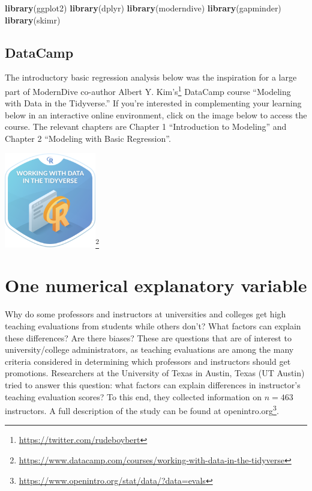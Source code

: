 \documentclass[12pt,]{krantz}
\makeatletter
\newenvironment{Shaded}{\begin{snugshade}}{\end{snugshade}}
\newcommand{\KeywordTok}[1]{\textcolor[rgb]{0.27,0.27,0.27}{\textbf{#1}}}
\newcommand{\NormalTok}[1]{#1}
\renewcommand{\href}[2]{#2\footnote{\url{#1}}}
\newenvironment{kframe}{%
\medskip{}
\setlength{\fboxsep}{.8em}
 \def\at@end@of@kframe{}%
 \ifinner\ifhmode%
  \def\at@end@of@kframe{\end{minipage}}%
  \begin{minipage}{\columnwidth}%
 \fi\fi%
 \def\FrameCommand##1{\hskip\@totalleftmargin \hskip-\fboxsep
 \colorbox{shadecolor}{##1}\hskip-\fboxsep
     \hskip-\linewidth \hskip-\@totalleftmargin \hskip\columnwidth}%
 \MakeFramed {\advance\hsize-\width
   \@totalleftmargin\z@ \linewidth\hsize
   \@setminipage}}%
 {\par\unskip\endMakeFramed%
 \at@end@of@kframe}
\renewenvironment{Shaded}{\begin{kframe}}{\end{kframe}}
\theoremstyle{definition}
\theoremstyle{definition}
\theoremstyle{definition}
\theoremstyle{remark}
\makeatother
\begin{document}
\begin{Shaded}
\begin{Highlighting}[]
\KeywordTok{library}\NormalTok{(ggplot2)}
\KeywordTok{library}\NormalTok{(dplyr)}
\KeywordTok{library}\NormalTok{(moderndive)}
\KeywordTok{library}\NormalTok{(gapminder)}
\KeywordTok{library}\NormalTok{(skimr)}
\end{Highlighting}
\end{Shaded}

\subsection*{DataCamp}\label{datacamp-3}


The introductory basic regression analysis below was the inspiration for
a large part of ModernDive co-author
\href{https://twitter.com/rudeboybert}{Albert Y. Kim's} DataCamp course
``Modeling with Data in the Tidyverse.'' If you're interested in
complementing your learning below in an interactive online environment,
click on the image below to access the course. The relevant chapters are
Chapter 1 ``Introduction to Modeling'' and Chapter 2 ``Modeling with
Basic Regression''.

\begin{center}
\href{https://www.datacamp.com/courses/working-with-data-in-the-tidyverse}{\includegraphics[width=0.3\textwidth]{images/datacamp_working_with_data.png}}
\end{center}

\section{One numerical explanatory variable}\label{model1}

Why do some professors and instructors at universities and colleges get
high teaching evaluations from students while others don't? What factors
can explain these differences? Are there biases? These are questions
that are of interest to university/college administrators, as teaching
evaluations are among the many criteria considered in determining which
professors and instructors should get promotions. Researchers at the
University of Texas in Austin, Texas (UT Austin) tried to answer this
question: what factors can explain differences in instructor's teaching
evaluation scores? To this end, they collected information on
\(n = 463\) instructors. A full description of the study can be found at
\href{https://www.openintro.org/stat/data/?data=evals}{openintro.org}.
\end{document}
